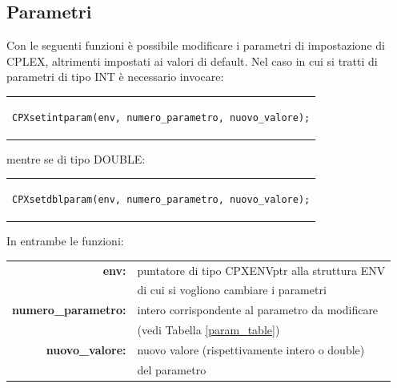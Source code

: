 \begin{center}
\begin{center}
\subsection{Parametri}\label{param}
Con le seguenti funzioni è possibile modificare i parametri di impostazione di CPLEX, altrimenti impostati ai valori di default.
Nel caso in cui si tratti di parametri di tipo INT è necessario invocare:\\
\begin{center}
\begin{tabular}{c}
\begin{lstlisting}[linewidth=330pt, basicstyle=\footnotesize\sffamily,]     
CPXsetintparam(env, numero_parametro, nuovo_valore);
\end{lstlisting}
\end{tabular}
\end{center}
mentre se di tipo DOUBLE:\\
\begin{center}
\begin{tabular}{c}
\begin{lstlisting}[linewidth=330pt, basicstyle=\footnotesize\sffamily,]     
CPXsetdblparam(env, numero_parametro, nuovo_valore);
\end{lstlisting}
\end{tabular}
\end{center}
In entrambe le funzioni:
\begin{table}[h]
\centering
\begin{tabular}{rl}
\textbf{env:} & {puntatore di tipo CPXENVptr alla struttura ENV}\\
& {di cui si vogliono cambiare i parametri}\\
\textbf{numero\_parametro:} & {intero corrispondente al parametro da modificare}\\
& {(vedi Tabella \ref{param_table})}\\
\textbf{nuovo\_valore:} & {nuovo valore (rispettivamente intero o double)}\\
& {del parametro}\\
\end{tabular}
\end{table}


\end{center}
\end{center}
